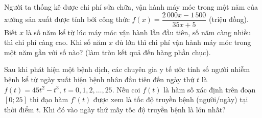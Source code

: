 \begin{ex}%
	Người ta thống kê được chi phí sửa chữa, vận hành máy móc trong một năm của xưởng sản xuất được tính bởi công thức $f(x)=\dfrac{2\,000x-1\,500}{35x+5}$ (triệu đồng). Biết $x$ là số năm kể từ lúc máy móc vận hành lần đầu tiên, số năm càng nhiều thì chi phí càng cao. Khi số năm $x$ đủ lớn thì chi phí vận hành máy móc trong một năm gần với số nào? (làm tròn kết quả đến hàng phần chục).
	
	
\end{ex}

\begin{ex}%
	Sau khi phát hiện một bệnh dịch, các chuyên gia y tế ước tính số người nhiễm bệnh kể từ ngày xuất hiện bệnh nhân đầu tiên đến ngày thứ $t$ là $f(t)=45t^2-t^3$, $t=0,1,2,\ldots,25$. Nếu coi $f(t)$ là hàm số xác định trên đoạn $[0;25]$ thì đạo hàm $f’(t)$ được xem là tốc độ truyền bệnh (người/ngày) tại thời điểm $t$. Khi đó vào ngày thứ mấy tốc độ truyền bệnh là lớn nhất?
\end{ex}

